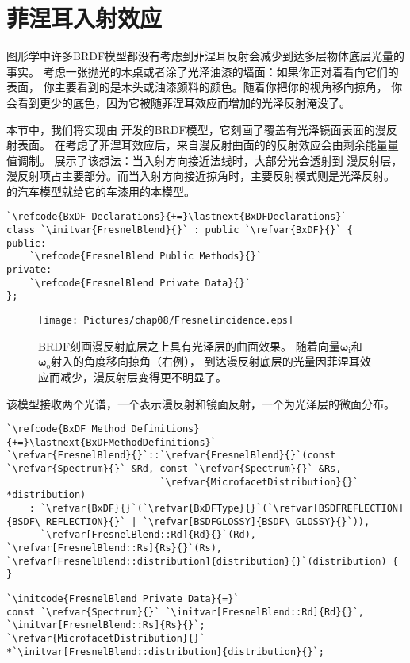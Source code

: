 \section{菲涅耳入射效应}\label{sec:菲涅耳入射效应}
图形学中许多BRDF模型都没有考虑到菲涅耳反射会减少到达多层物体底层光量的事实。
考虑一张抛光的木桌或者涂了光泽油漆的墙面：如果你正对着看向它们的表面，
你主要看到的是木头或油漆颜料的颜色。随着你把你的视角移向掠角，
你会看到更少的底色，因为它被随菲涅耳效应而增加的光泽反射淹没了。

本节中，我们将实现由\citet{AshikhminPhong,Ashikhmin01012000}
开发的BRDF模型，它刻画了覆盖有光泽镜面表面的漫反射表面。
在考虑了菲涅耳效应后，来自漫反射曲面的的反射效应会由剩余能量量值调制。
展示了该想法：当入射方向接近法线时，大部分光会透射到
漫反射层，漫反射项占主要部分。而当入射方向接近掠角时，主要反射模式则是光泽反射。
的汽车模型就给它的车漆用的本模型。
\begin{lstlisting}
`\refcode{BxDF Declarations}{+=}\lastnext{BxDFDeclarations}`
class `\initvar{FresnelBlend}{}` : public `\refvar{BxDF}{}` {
public:
    `\refcode{FresnelBlend Public Methods}{}`
private:
    `\refcode{FresnelBlend Private Data}{}`
};
\end{lstlisting}

\begin{figure}[htbp]
    \centering
    \texttt{[image: Pictures/chap08/Fresnelincidence.eps]}
    \caption{ BRDF刻画漫反射底层之上具有光泽层的曲面效果。
    随着向量${\bm\omega}_{\mathrm{i}}$和${\bm\omega}_{\mathrm{o}}$射入的角度移向掠角（右例），
    到达漫反射底层的光量因菲涅耳效应而减少，漫反射层变得更不明显了。}
    \label{fig:8.23}
\end{figure}

该模型接收两个光谱，一个表示漫反射和镜面反射，一个为光泽层的微面分布。
\begin{lstlisting}
`\refcode{BxDF Method Definitions}{+=}\lastnext{BxDFMethodDefinitions}`
`\refvar{FresnelBlend}{}`::`\refvar{FresnelBlend}{}`(const `\refvar{Spectrum}{}` &Rd, const `\refvar{Spectrum}{}` &Rs,
                           `\refvar{MicrofacetDistribution}{}` *distribution) 
    : `\refvar{BxDF}{}`(`\refvar{BxDFType}{}`(`\refvar[BSDFREFLECTION]{BSDF\_REFLECTION}{}` | `\refvar[BSDFGLOSSY]{BSDF\_GLOSSY}{}`)),
      `\refvar[FresnelBlend::Rd]{Rd}{}`(Rd), `\refvar[FresnelBlend::Rs]{Rs}{}`(Rs), `\refvar[FresnelBlend::distribution]{distribution}{}`(distribution) { }
\end{lstlisting}
\begin{lstlisting}
`\initcode{FresnelBlend Private Data}{=}`
const `\refvar{Spectrum}{}` `\initvar[FresnelBlend::Rd]{Rd}{}`, `\initvar[FresnelBlend::Rs]{Rs}{}`;
`\refvar{MicrofacetDistribution}{}` *`\initvar[FresnelBlend::distribution]{distribution}{}`;
\end{lstlisting}

